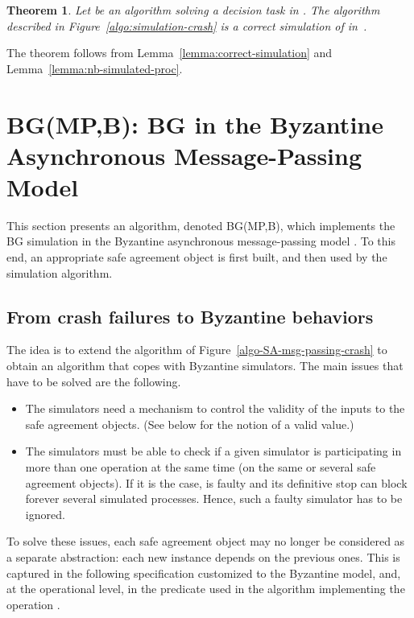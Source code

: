 \documentclass[11pt,letterpaper]{article}
\newtheorem{theorem}{Theorem}
\newlength {\afterproof}
\newcommand{\toto}{xxx}
\newenvironment{proofT}{\noindent{\bf Proof }}
{\hspace*{\fill}\par\vspace{\afterproof}}
\begin{document}
\begin{theorem}
\label{theorem:main-simulation}
Let  be an algorithm solving a decision task in .
The algorithm described in Figure~\ref{algo:simulation-crash} is a
correct simulation of  in~.
\end{theorem}

\begin{proofT}
The theorem follows from  Lemma~\ref{lemma:correct-simulation} and Lemma~\ref{lemma:nb-simulated-proc}.
\renewcommand{\toto}{theorem:main-simulation}
\end{proofT}




\section{BG(MP,B): BG in the Byzantine Asynchronous Message-Passing  Model}
\label{sec:BG-byzantine-model}

This section presents an algorithm, denoted BG(MP,B), which implements the BG
simulation in the Byzantine asynchronous message-passing model .
To this end, an appropriate  safe agreement object is first built, and then
used by the simulation algorithm.



\subsection{From crash failures to Byzantine behaviors}
The idea is to extend the algorithm of Figure~\ref{algo-SA-msg-passing-crash}
to obtain an algorithm that copes with Byzantine simulators.
The main issues that have to be solved are the following.
\begin{itemize}
\vspace{-0.2cm}
\item
The simulators  need a  mechanism to  control the  validity of the inputs
to the safe agreement objects. (See below for the notion of a valid value.)
\vspace{-0.2cm}
\item
The simulators must be able to check if a given simulator  is
participating in more than one operation  at the same time
(on the same or several safe agreement objects).
If it is the case,  is faulty and its definitive stop  can block forever
several simulated processes. Hence, such a faulty simulator has to be ignored.
\end{itemize}
To solve these issues, each safe agreement object may no longer be considered
as a separate abstraction: each new instance depends on the previous ones. This
is captured in the following specification customized to the Byzantine
model, and, at the operational level, in the predicate 
used in the algorithm implementing the operation .
\end{document}

